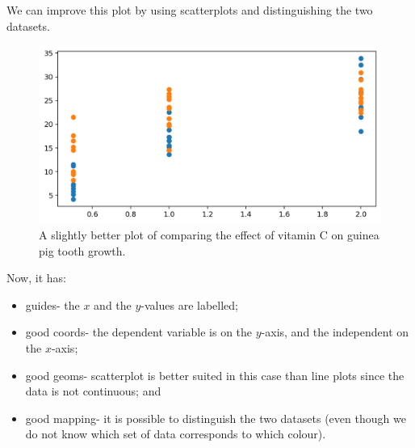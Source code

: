 \documentclass[a4paper, openany]{memoir}
\begin{document}
We can improve this plot by using scatterplots and distinguishing the two datasets.
\begin{figure}[H]
    \centering
    \includegraphics[scale=0.5]{src/2.12 VitC Example Plot 2.png}
    \caption{A slightly better plot of comparing the effect of vitamin C on guinea pig tooth growth.}
\end{figure}
Now, it has:
\begin{itemize}
    \item guides- the $x$ and the $y$-values are labelled;
    \item good coords- the dependent variable is on the $y$-axis, and the independent on the $x$-axis;
    \item good geoms- scatterplot is better suited in this case than line plots since the data is not continuous; and
    \item good mapping- it is possible to distinguish the two datasets (even though we do not know which set of data corresponds to which colour).
\end{itemize}
\end{document}

